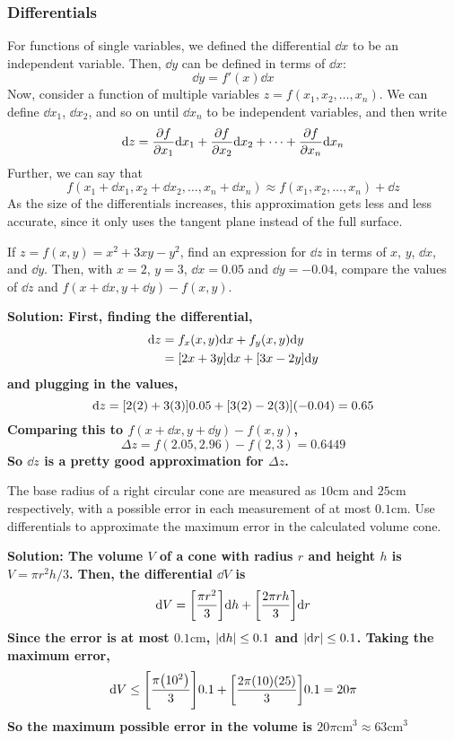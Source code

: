 \subsubsection{Differentials}
For functions of single variables, we defined the differential \(\dd x\) to be an independent variable. Then, \(\dd y\) can be defined in terms of \(\dd x\):
\[ \dd y = f'(x)\dd x\]
Now, consider a function of multiple variables \(z = f(x_1, x_2, \dots, x_n)\). We can define \(\dd x_1\), \(\dd x_2\), and so on until \(\dd x_n\) to be independent variables, and then write
\[ \dd z = \pdv{f}{x_1}\dd x_1 + \pdv{f}{x_2}\dd x_2 + \dots + \pdv{f}{x_n}\dd x_n\]
Further, we can say that
\[ f(x_1 + \dd x_1, x_2 + \dd x_2, \dots, x_n + \dd x_n) \approx f(x_1, x_2, \dots, x_n) + \dd z\]
As the size of the differentials increases, this approximation gets less and less accurate, since it only uses the tangent plane instead of the full surface.
\begin{example}
    If \(z=f(x,y)=x^2+3xy-y^2\), find an expression for \(\dd z\) in terms of \(x\), \(y\), \(\dd x\), and \(\dd y\). Then, with \(x = 2\), \(y=3\), \(\dd x = 0.05\) and \(\dd y = -0.04\), compare the values of \(\dd z\) and \(f(x + \dd x, y + \dd y) - f(x,y)\).
    \par\bf{Solution: }First, finding the differential,
    \begin{align*}
        \dd z &= f_x(x,y)\dd x + f_y(x, y)\dd y \\
        &= \bqty{2x+3y}\dd x + \bqty{3x-2y}\dd y
    \end{align*}
    and plugging in the values,
    \[ \dd z = \bqty{2(2) + 3(3)} 0.05+\bqty{3(2) - 2(3)}(-0.04) = 0.65 \]
    Comparing this to \(f(x + \dd x, y + \dd y) - f(x,y) \),
    \[ \Delta z = f(2.05, 2.96) - f(2, 3) = 0.6449\]
    So \(\dd z\) is a pretty good approximation for \(\Delta z\).
\end{example}
\begin{example}
    The base radius of a right circular cone are measured as \(10 \unit{\centi\metre}\) and \(25 \unit{\centi\metre}\) respectively, with a possible error in each measurement of at most \(0.1\unit{\centi\metre}\). Use differentials to approximate the maximum error in the calculated volume cone.
    \par\bf{Solution: }The volume \(V\) of a cone with radius \(r\) and height \(h\) is \(V = \pi r^2h/3\). Then, the differential \(\dd V\) is 
    \[ \dd V = \bqty{\frac{\pi r^2}{3}}\dd h + \bqty{\frac{2\pi rh}{3}}\dd r\]
    Since the error is at most \(0.1\unit{\centi\metre}\), \(\abs{\dd h} \leq 0.1\) and \(\abs{\dd r}\leq 0.1\). Taking the maximum error,
    \[ \dd V \leq \bqty{\frac{\pi\pqty{ 10^2}}{3}}0.1+\bqty{\frac{2\pi(10)(25)}{3}}0.1 = 20\pi \]
    So the maximum possible error in the volume is \(20\pi \unit{\centi\metre^3}\approx 63\unit{\centi\metre^3}\)
\end{example}
